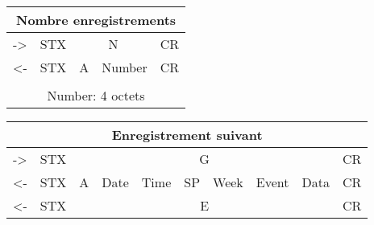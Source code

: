         
\begin{table}[h]
\begin{center}
    \begin{tabular}{|c|c|c|c|c|}
    \hline
    \multicolumn{5}{|c|}{Nombre enregistrements} \\
    \hline
    -> & STX & \multicolumn{2}{c|}{N} & CR \\
    \hline
    <- & STX & A & Number & CR \\
    \hline
    \multicolumn{5}{|c|}{} \\
    \hline
    \multicolumn{5}{|c|}{Number: 4 octets } \\
    \hline
    \end{tabular} 
\end{center}
\end{table}


\begin{table}[h]
\begin{center}
    \begin{tabular}{|c|c|c|c|c|c|c|c|c|c|}
    \hline
    \multicolumn{10}{|c|}{Enregistrement suivant} \\
    \hline
    -> & STX & \multicolumn{7}{c|}{G} & CR \\
    \hline
    <- & STX & A & Date & Time & SP & Week & Event & Data & CR \\
    \hline
    <- & STX & \multicolumn{7}{c|}{E} & CR \\
    \hline
    \end{tabular} 
\end{center}
\end{table}

